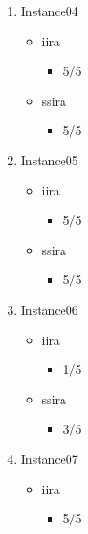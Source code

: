 \begin{enumerate}
    \item Instance04
    \begin{itemize}
        \item \ac{iira}
        \begin{itemize}
            \item 5/5
        \end{itemize}

        \item \ac{ssira}
        \begin{itemize}
            \item 5/5
        \end{itemize}
    \end{itemize}

    \item Instance05
    \begin{itemize}
        \item \ac{iira}
        \begin{itemize}
            \item 5/5
        \end{itemize}

        \item \ac{ssira}
        \begin{itemize}
            \item 5/5
        \end{itemize}
    \end{itemize}

    \item Instance06
    \begin{itemize}
        \item \ac{iira}
        \begin{itemize}
            \item 1/5
        \end{itemize}

        \item \ac{ssira}
        \begin{itemize}
            \item 3/5
        \end{itemize}
    \end{itemize}

    \item Instance07
    \begin{itemize}
        \item \ac{iira}
        \begin{itemize}
            \item 5/5
        \end{itemize}


\end{itemize}
\end{enumerate}
